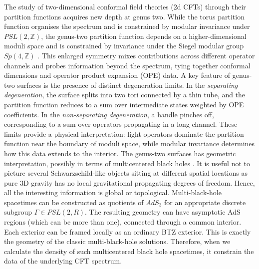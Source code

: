 \documentclass[12 pt]{article}
\begin{document}
The study of two-dimensional conformal field theories (2d CFTs) through their partition functions acquires new depth at genus two. While the torus partition function organises the spectrum and is constrained by modular invariance under $PSL(2,\mathbb{Z})$, the genus-two partition function depends on a higher-dimensional moduli space and is constrained by invariance under the Siegel modular group $Sp(4,\mathbb{Z})$ \cite{Collier:2023fwi}. This enlarged symmetry mixes contributions across different operator channels and probes information beyond the spectrum, tying together conformal dimensions and operator product expansion (OPE) data. A key feature of genus-two surfaces is the presence of distinct degeneration limits. In the \emph{separating degeneration}, the surface splits into two tori connected by a thin tube, and the partition function reduces to a sum over intermediate states weighted by OPE coefficients. In the \emph{non-separating degeneration}, a handle pinches off, corresponding to a sum over operators propagating in a long channel. These limits provide a physical interpretation: light operators dominate the partition function near the boundary of moduli space, while modular invariance determines how this data extends to the interior. The genus-two surfaces has geometric interpretation, possibly in terms of multicentered black holes \cite{Brill:1995jv,Cai:2022qac}. It is useful not to picture several Schwarzschild-like objects sitting at different spatial locations as pure 3D  gravity has no local gravitational propagating degrees of freedom. Hence, all the interesting information is global or topological. Multi-black-hole spacetimes can be constructed as quotients of $AdS_3$ for an appropriate discrete subgroup $\Gamma\in PSL(2,R)$. The resulting geometry can have asymptotic AdS regions (which can be more than one), connected through a common interior. Each exterior can be framed locally as an ordinary BTZ exterior. This is exactly the geometry of the classic multi-black-hole solutions. Therefore, when we calculate the density of such multicentered black hole spacetimes, it constrain the data of the underlying CFT spectrum.\\ \par
\end{document}
